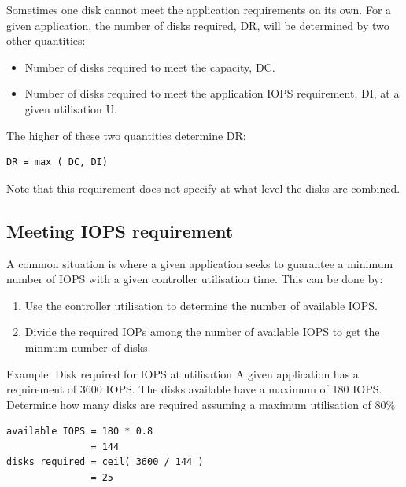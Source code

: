 Sometimes one disk cannot meet the application requirements on its own.
For a given application, the number of disks required, DR, will be
determined by two other quantities:

\begin{itemize}
\item
  Number of disks required to meet the capacity, DC.
\item
  Number of disks required to meet the application IOPS requirement, DI,
  at a given utilisation U.
\end{itemize}

The higher of these two quantities determine DR:

\begin{verbatim}
DR = max ( DC, DI) 
\end{verbatim}

Note that this requirement does not specify at what level the disks are
combined.

\subsection{Meeting IOPS requirement}\label{meeting-iops-requirement}

A common situation is where a given application seeks to guarantee a
minimum number of IOPS with a given controller utilisation time. This
can be done by:

\begin{enumerate}
\item
  Use the controller utilisation to determine the number of available
  IOPS.
\item
  Divide the required IOPs among the number of available IOPS to get the
  minmum number of disks.
\end{enumerate}

Example: Disk required for IOPS at utilisation A given application has a
requirement of 3600 IOPS. The disks available have a maximum of 180
IOPS. Determine how many disks are required assuming a maximum
utilisation of 80\%

\begin{verbatim}
available IOPS = 180 * 0.8
               = 144
disks required = ceil( 3600 / 144 )
               = 25
\end{verbatim}